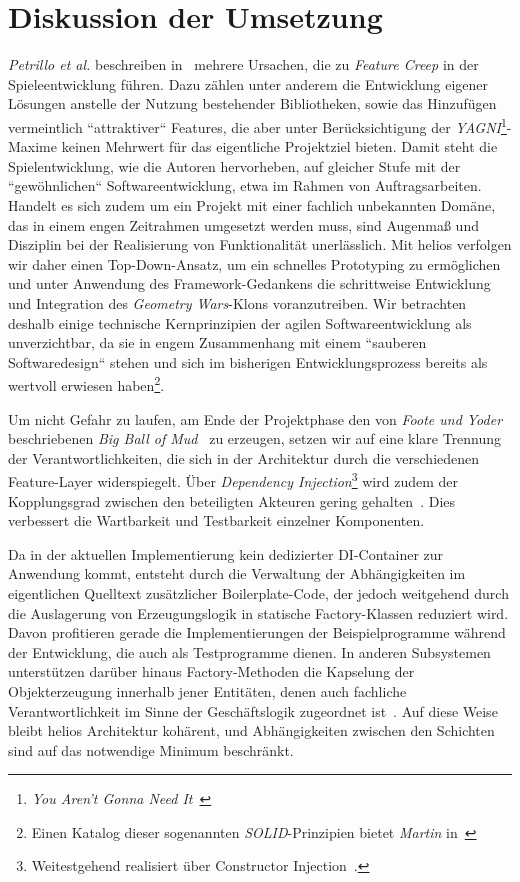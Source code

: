 \section{Diskussion der Umsetzung}

\textit{Petrillo et al.} beschreiben in~\cite[]{PPTD08} mehrere Ursachen, die zu \textit{Feature Creep} in der Spieleentwicklung führen.
Dazu zählen unter anderem die Entwicklung eigener Lösungen anstelle der Nutzung bestehender Bibliotheken, sowie das Hinzufügen vermeintlich ``attraktiver`` Features, die aber unter Berücksichtigung der \textit{YAGNI}\footnote{\textit{You Aren't Gonna Need It}~\cite[]{Sch07}}-Maxime keinen Mehrwert für das eigentliche Projektziel bieten.
Damit steht die Spielentwicklung, wie die Autoren hervorheben, auf gleicher Stufe mit der ``gewöhnlichen`` Softwareentwicklung, etwa im Rahmen von Auftragsarbeiten.
Handelt es sich zudem um ein Projekt mit einer fachlich unbekannten Domäne, das in einem engen Zeitrahmen umgesetzt werden muss, sind Augenmaß und Disziplin bei der Realisierung von Funktionalität unerlässlich.
Mit helios verfolgen wir daher einen Top-Down-Ansatz, um ein schnelles Prototyping zu ermöglichen und unter Anwendung des Framework-Gedankens die schrittweise Entwicklung und Integration des \textit{Geometry Wars}-Klons voranzutreiben.
Wir betrachten deshalb einige technische Kernprinzipien der agilen Softwareentwicklung als unverzichtbar, da sie in engem Zusammenhang mit einem ``sauberen Softwaredesign`` stehen und sich im bisherigen Entwicklungsprozess bereits als wertvoll erwiesen haben\footnote{Einen Katalog dieser sogenannten \textit{SOLID}-Prinzipien bietet \textit{Martin} in~\cite[]{Mar03}}.\par

Um nicht Gefahr zu laufen, am Ende der Projektphase den von \textit{Foote und Yoder} beschriebenen  \textit{Big Ball of Mud}~\cite[]{FY99} zu erzeugen, setzen wir auf eine klare Trennung der Verantwortlichkeiten, die sich in der Architektur durch die verschiedenen Feature-Layer widerspiegelt.
Über \textit{Dependency Injection}\footnote{
    Weitestgehend realisiert über Constructor Injection~\cite[]{FowlerDI}.
} wird zudem der Kopplungsgrad zwischen den beteiligten Akteuren gering gehalten~\cite[]{SZ10}.
Dies verbessert die Wartbarkeit und Testbarkeit einzelner Komponenten.\par
Da in der aktuellen Implementierung kein dedizierter DI-Container zur Anwendung kommt, entsteht durch die Verwaltung der Abhängigkeiten im eigentlichen Quelltext zusätzlicher Boilerplate-Code, der jedoch weitgehend durch die Auslagerung von Erzeugungslogik in statische Factory-Klassen reduziert wird.
Davon profitieren gerade die Implementierungen der Beispielprogramme während der Entwicklung, die auch als Testprogramme dienen.
In anderen Subsystemen unterstützen darüber hinaus Factory-Methoden die Kapselung der Objekterzeugung innerhalb jener Entitäten, denen auch fachliche Verantwortlichkeit im Sinne der Geschäftslogik zugeordnet ist~\cite[139 f.]{Eva03}.
Auf diese Weise bleibt helios Architektur kohärent, und Abhängigkeiten zwischen den Schichten sind auf das notwendige Minimum beschränkt.
\par

